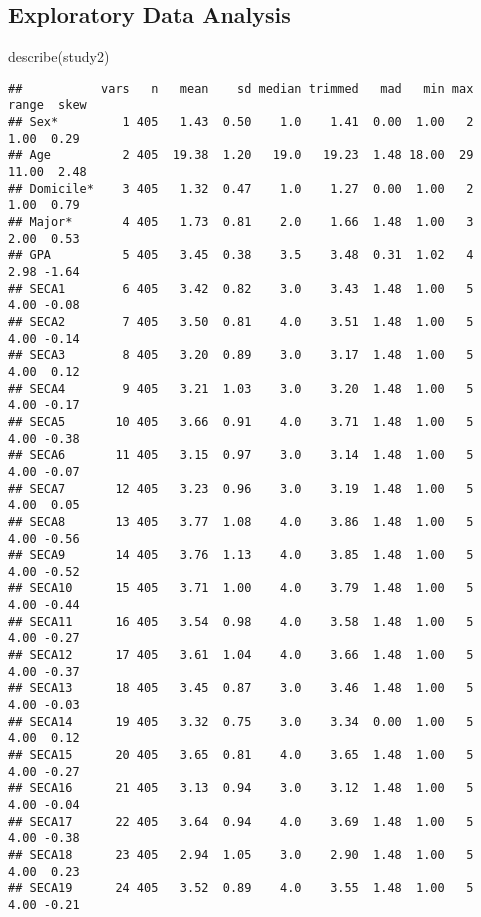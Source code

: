 \documentclass[
]{article}
\newenvironment{Shaded}{\begin{snugshade}}{\end{snugshade}}
\newcommand{\FunctionTok}[1]{\textcolor[rgb]{0.00,0.00,0.00}{#1}}
\newcommand{\NormalTok}[1]{#1}
\begin{document}
\hypertarget{exploratory-data-analysis-1}{%
\subsection{Exploratory Data
Analysis}\label{exploratory-data-analysis-1}}

\begin{Shaded}
\begin{Highlighting}[]
\FunctionTok{describe}\NormalTok{(study2)}
\end{Highlighting}
\end{Shaded}

\begin{verbatim}
##           vars   n   mean    sd median trimmed   mad   min max range  skew
## Sex*         1 405   1.43  0.50    1.0    1.41  0.00  1.00   2  1.00  0.29
## Age          2 405  19.38  1.20   19.0   19.23  1.48 18.00  29 11.00  2.48
## Domicile*    3 405   1.32  0.47    1.0    1.27  0.00  1.00   2  1.00  0.79
## Major*       4 405   1.73  0.81    2.0    1.66  1.48  1.00   3  2.00  0.53
## GPA          5 405   3.45  0.38    3.5    3.48  0.31  1.02   4  2.98 -1.64
## SECA1        6 405   3.42  0.82    3.0    3.43  1.48  1.00   5  4.00 -0.08
## SECA2        7 405   3.50  0.81    4.0    3.51  1.48  1.00   5  4.00 -0.14
## SECA3        8 405   3.20  0.89    3.0    3.17  1.48  1.00   5  4.00  0.12
## SECA4        9 405   3.21  1.03    3.0    3.20  1.48  1.00   5  4.00 -0.17
## SECA5       10 405   3.66  0.91    4.0    3.71  1.48  1.00   5  4.00 -0.38
## SECA6       11 405   3.15  0.97    3.0    3.14  1.48  1.00   5  4.00 -0.07
## SECA7       12 405   3.23  0.96    3.0    3.19  1.48  1.00   5  4.00  0.05
## SECA8       13 405   3.77  1.08    4.0    3.86  1.48  1.00   5  4.00 -0.56
## SECA9       14 405   3.76  1.13    4.0    3.85  1.48  1.00   5  4.00 -0.52
## SECA10      15 405   3.71  1.00    4.0    3.79  1.48  1.00   5  4.00 -0.44
## SECA11      16 405   3.54  0.98    4.0    3.58  1.48  1.00   5  4.00 -0.27
## SECA12      17 405   3.61  1.04    4.0    3.66  1.48  1.00   5  4.00 -0.37
## SECA13      18 405   3.45  0.87    3.0    3.46  1.48  1.00   5  4.00 -0.03
## SECA14      19 405   3.32  0.75    3.0    3.34  0.00  1.00   5  4.00  0.12
## SECA15      20 405   3.65  0.81    4.0    3.65  1.48  1.00   5  4.00 -0.27
## SECA16      21 405   3.13  0.94    3.0    3.12  1.48  1.00   5  4.00 -0.04
## SECA17      22 405   3.64  0.94    4.0    3.69  1.48  1.00   5  4.00 -0.38
## SECA18      23 405   2.94  1.05    3.0    2.90  1.48  1.00   5  4.00  0.23
## SECA19      24 405   3.52  0.89    4.0    3.55  1.48  1.00   5  4.00 -0.21

\end{verbatim}
\end{document}
